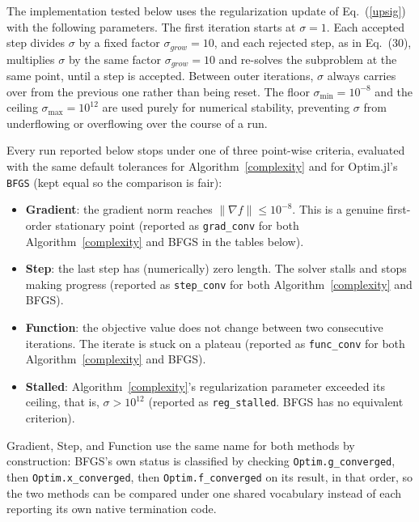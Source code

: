 \documentclass[11pt]{article}
\begin{document}
The implementation tested below uses the regularization update of
Eq.~(\ref{upsig}) with the following parameters. The first iteration starts at
$\sigma = 1$. Each accepted step divides $\sigma$ by a fixed factor
$\sigma_{grow} = 10$, and each rejected step, as in Eq.~(30), multiplies
$\sigma$ by the same factor $\sigma_{grow} = 10$ and re-solves the
subproblem at the same point, until a step is accepted. Between outer
iterations, $\sigma$ always carries over from the previous one rather
than being reset. The floor $\sigma_{\min} = 10^{-8}$ and the ceiling
$\sigma_{\max} = 10^{12}$ are used purely for numerical stability,
preventing $\sigma$ from underflowing or overflowing over the course of a
run.

Every run reported below stops under one of three point-wise criteria,
evaluated with the same default tolerances for Algorithm~\ref{complexity} and for
Optim.jl's \texttt{BFGS} \cite{Mogensen2018} (kept equal so the comparison
is fair):
\begin{itemize}
    \item \textbf{Gradient}: the gradient norm reaches $\|\nabla f\| \le 10^{-8}$. This is a genuine first-order stationary point (reported as \texttt{grad\_conv} for both Algorithm~\ref{complexity} and BFGS in the tables below).
    \item \textbf{Step}: the last step has (numerically) zero length. The solver stalls and stops making progress (reported as \texttt{step\_conv} for both Algorithm~\ref{complexity} and BFGS).
    \item \textbf{Function}: the objective value does not change between two consecutive iterations. The iterate is stuck on a plateau (reported as \texttt{func\_conv} for both Algorithm~\ref{complexity} and BFGS).
    \item \textbf{Stalled}: Algorithm~\ref{complexity}'s regularization parameter exceeded its
    ceiling, that is, $\sigma > 10^{12}$ (reported as \texttt{reg\_stalled}. BFGS has no equivalent criterion).
\end{itemize}
Gradient, Step, and Function use the same name for both methods by
construction: BFGS's own status is classified by checking
\texttt{Optim.g\_converged}, then \texttt{Optim.x\_converged}, then
\texttt{Optim.f\_converged} on its result, in that order, so the two
methods can be compared under one shared vocabulary instead of each
reporting its own native termination code.
\end{document}

